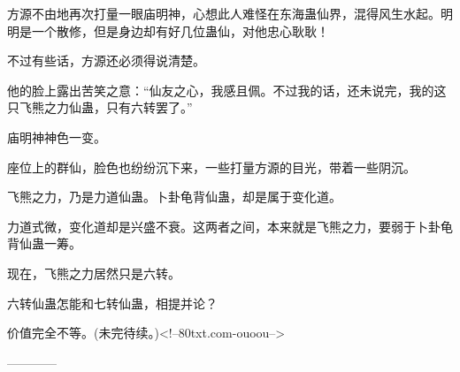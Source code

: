 \begin{this_body}
方源不由地再次打量一眼庙明神，心想此人难怪在东海蛊仙界，混得风生水起。明明是一个散修，但是身边却有好几位蛊仙，对他忠心耿耿！

不过有些话，方源还必须得说清楚。

他的脸上露出苦笑之意：“仙友之心，我感且佩。不过我的话，还未说完，我的这只飞熊之力仙蛊，只有六转罢了。”

庙明神神色一变。

座位上的群仙，脸色也纷纷沉下来，一些打量方源的目光，带着一些阴沉。

飞熊之力，乃是力道仙蛊。卜卦龟背仙蛊，却是属于变化道。

力道式微，变化道却是兴盛不衰。这两者之间，本来就是飞熊之力，要弱于卜卦龟背仙蛊一筹。

现在，飞熊之力居然只是六转。

六转仙蛊怎能和七转仙蛊，相提并论？

价值完全不等。(未完待续。)<!--80txt.com-ouoou-->

------------

\end{this_body}

